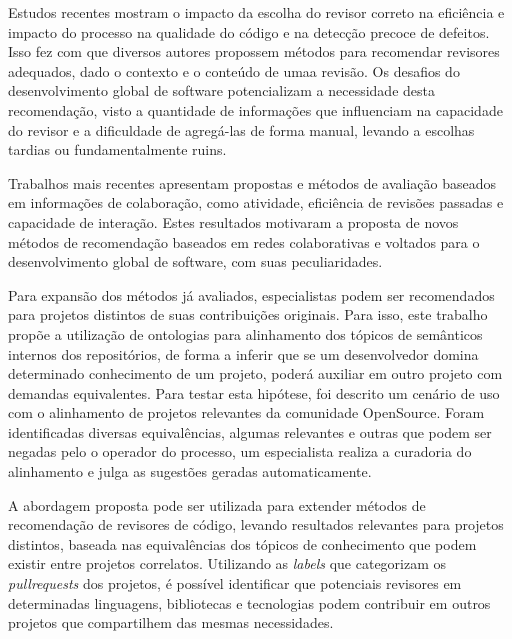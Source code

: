 \documentclass[sigconf]{acmart}
\begin{document}
Estudos recentes mostram o impacto da escolha do revisor correto na eficiência e impacto do processo na qualidade do código e na detecção precoce de defeitos. Isso fez com que diversos autores propossem métodos para recomendar revisores adequados, dado o contexto e o conteúdo de umaa revisão. Os desafios do desenvolvimento global de software potencializam a necessidade desta recomendação, visto a quantidade de informações que influenciam na capacidade do revisor e a dificuldade de agregá-las de forma manual, levando a escolhas tardias ou fundamentalmente ruins.

Trabalhos mais recentes apresentam propostas e métodos de avaliação baseados em informações de colaboração, como atividade, eficiência de revisões passadas e capacidade de interação. Estes resultados motivaram a proposta de novos métodos de recomendação baseados em redes colaborativas e voltados para o desenvolvimento global de software, com suas peculiaridades.

Para expansão dos métodos já avaliados, especialistas podem ser recomendados para projetos distintos de suas contribuições originais. Para isso, este trabalho propõe a utilização de ontologias para alinhamento dos tópicos de semânticos internos dos repositórios, de forma a inferir que se um desenvolvedor domina determinado conhecimento de um projeto, poderá auxiliar em outro projeto com demandas equivalentes. Para testar esta hipótese, foi descrito um cenário de uso com o alinhamento de projetos relevantes da comunidade OpenSource. Foram identificadas diversas equivalências, algumas relevantes e outras que podem ser negadas pelo o operador do processo, um especialista realiza a curadoria do alinhamento e julga as sugestões geradas automaticamente.

A abordagem proposta pode ser utilizada para extender métodos de recomendação de revisores de código, levando resultados relevantes para projetos distintos, baseada nas equivalências dos tópicos de conhecimento que podem existir entre projetos correlatos. Utilizando as \textit{labels} que categorizam os \textit{pullrequests} dos projetos, é possível identificar que potenciais revisores em determinadas linguagens, bibliotecas e tecnologias podem contribuir em outros projetos que compartilhem das mesmas necessidades.
\end{document}
